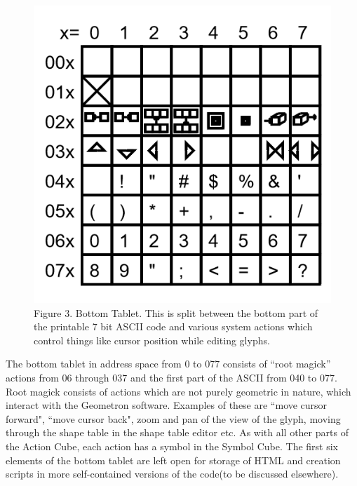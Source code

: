 \documentclass[11pt]{article}
\begin{document}
\begin{figure}
\includegraphics{figures/figure3_bottomTablet.png}

\caption{Figure 3. Bottom Tablet.  This is split between the bottom part of the printable 7 bit ASCII code and various system actions which control things like cursor position while editing glyphs. }
\end{figure}

    The bottom tablet in address space from 0 to 077 consists of ``root magick'' actions from 06 through 037 and the first part of the ASCII from 040 to 077.  Root magick consists of actions which are not purely geometric in nature, which interact with the Geometron software.  Examples of these are ``move cursor forward", ``move cursor back", zoom and pan of the view of the glyph, moving through the shape table in the shape table editor etc.  As with all other parts of the Action Cube, each action has a symbol in the Symbol Cube.  The first six elements of the bottom tablet are left open for storage of HTML and creation scripts in more self-contained versions of the code(to be discussed elsewhere).  
\end{document}
